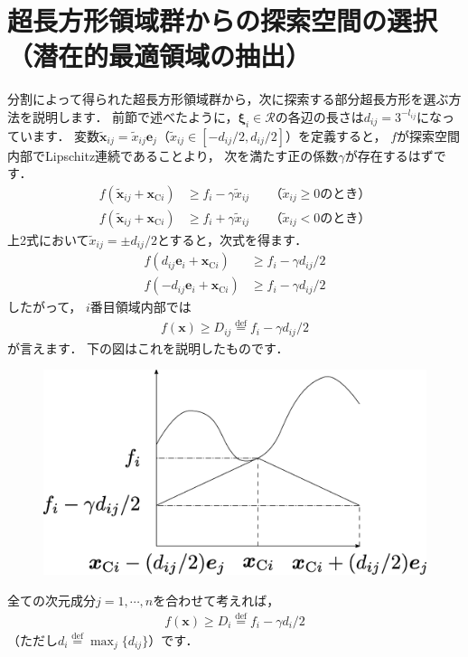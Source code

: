 ﻿\documentclass{jsarticle}
\begin{document}
\section{超長方形領域群からの探索空間の選択（潜在的最適領域の抽出）}

分割によって得られた超長方形領域群から，次に探索する部分超長方形を選ぶ方法を説明します．
前節で述べたように，$\bm{\xi}_{i}\in\mathcal{R}$の各辺の長さは$d_{ij}=3^{-l_{ij}}$になっています．
変数$\tilde{\bm{x}}_{ij}=\tilde{x}_{ij}\bm{e}_{j}$（$\tilde{x}_{ij}\in[-d_{ij}/2,d_{ij}/2]$）を定義すると，
$f$が探索空間内部でLipschitz連続であることより，
次を満たす正の係数$\gamma$が存在するはずです．
\begin{align*}
f(\tilde{\bm{x}}_{ij}+\bm{x}_{\mathrm{C}i})&\geq f_{i}-\gamma\tilde{x}_{ij}
& &\mbox{（$\tilde{x}_{ij}\geq 0$のとき）}
\\
f(\tilde{\bm{x}}_{ij}+\bm{x}_{\mathrm{C}i})&\geq f_{i}+\gamma\tilde{x}_{ij}
& &\mbox{（$\tilde{x}_{ij}< 0$のとき）}
\end{align*}
上2式において$\tilde{x}_{ij}=\pm d_{ij}/2$とすると，次式を得ます．
\begin{align*}
f(d_{ij}\bm{e}_{i}+\bm{x}_{\mathrm{C}i})&\geq f_{i}-\gamma d_{ij}/2
\\
f(-d_{ij}\bm{e}_{i}+\bm{x}_{\mathrm{C}i})&\geq f_{i}-\gamma d_{ij}/2
\end{align*}
したがって，
$i$番目領域内部では
\begin{align*}
f(\bm{x})\geq D_{ij}\overset{\mathrm{def}}{=}f_{i}-\gamma d_{ij}/2
\end{align*}
が言えます．
下の図はこれを説明したものです．

\begin{figure}[h]
\begin{center}
\includegraphics[width=.7\textwidth]{fig/DIRECT_lipschitz_lowerbound.eps}
\end{center}
\end{figure}

全ての次元成分$j=1,\cdots,n$を合わせて考えれば，
\begin{align*}
f(\bm{x})\geq D_{i}\overset{\mathrm{def}}{=}f_{i}-\gamma d_{i}/2
\end{align*}
（ただし$d_{i}\overset{\mathrm{def}}{=}\max_{j}\{d_{ij}\}$）です．
\end{document}
